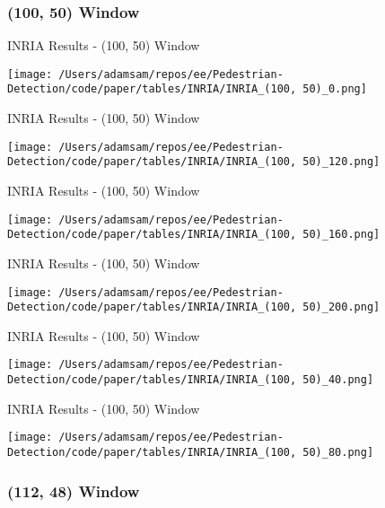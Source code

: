 
\subsubsection*{(100, 50) Window}

\begin{table}
    \caption{INRIA Results - (100, 50) Window}
    \texttt{[image: /Users/adamsam/repos/ee/Pedestrian-Detection/code/paper/tables/INRIA/INRIA\_(100, 50)\_0.png]}
    \label{tab:INRIA_(100, 50)_0}
\end{table}

\begin{table}
    \caption{INRIA Results - (100, 50) Window}
    \texttt{[image: /Users/adamsam/repos/ee/Pedestrian-Detection/code/paper/tables/INRIA/INRIA\_(100, 50)\_120.png]}
    \label{tab:INRIA_(100, 50)_120}
\end{table}

\begin{table}
    \caption{INRIA Results - (100, 50) Window}
    \texttt{[image: /Users/adamsam/repos/ee/Pedestrian-Detection/code/paper/tables/INRIA/INRIA\_(100, 50)\_160.png]}
    \label{tab:INRIA_(100, 50)_160}
\end{table}

\begin{table}
    \caption{INRIA Results - (100, 50) Window}
    \texttt{[image: /Users/adamsam/repos/ee/Pedestrian-Detection/code/paper/tables/INRIA/INRIA\_(100, 50)\_200.png]}
    \label{tab:INRIA_(100, 50)_200}
\end{table}

\begin{table}
    \caption{INRIA Results - (100, 50) Window}
    \texttt{[image: /Users/adamsam/repos/ee/Pedestrian-Detection/code/paper/tables/INRIA/INRIA\_(100, 50)\_40.png]}
    \label{tab:INRIA_(100, 50)_40}
\end{table}

\begin{table}
    \caption{INRIA Results - (100, 50) Window}
    \texttt{[image: /Users/adamsam/repos/ee/Pedestrian-Detection/code/paper/tables/INRIA/INRIA\_(100, 50)\_80.png]}
    \label{tab:INRIA_(100, 50)_80}
\end{table}

\subsubsection*{(112, 48) Window}

